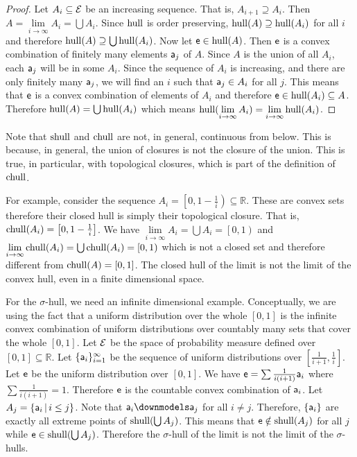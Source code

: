 \begin{mathSection}
\begin{proof}
	Let $A_i \subseteq \Ens$ be an increasing sequence. That is, $A_{i+1} \supseteq A_i$. Then $A = \lim\limits_{i \to \infty} A_i = \bigcup A_i$. Since $\hull$ is order preserving, $\hull(A) \supseteq \hull(A_i)$ for all $i$ and therefore $\hull(A) \supseteq \bigcup \hull(A_i)$. Now let $\ens \in \hull(A)$. Then $\ens$ is a convex combination of finitely many elements $\ens[a]_j$ of $A$. Since $A$ is the union of all $A_i$, each $\ens[a]_j$ will be in some $A_i$. Since the sequence of $A_i$ is increasing, and there are only finitely many $\ens[a]_j$, we will find an $i$ such that $\ens[a]_j \in A_i$ for all $j$. This means that $\ens$ is a convex combination of elements of $A_i$ and therefore $\ens \in \hull(A_i) \subseteq A$. Therefore $\hull(A) = \bigcup \hull(A_i)$ which means $\hull(\lim\limits_{i \to \infty} A_i) = \lim\limits_{i \to \infty} \hull(A_i)$.
\end{proof}


\begin{remark}
	Note that $\shull$ and $\chull$ are not, in general, continuous from below. This is because, in general, the union of closures is not the closure of the union. This is true, in particular, with topological closures, which is part of the definition of $\chull$.
	
	For example, consider the sequence $A_i = \left[0, 1-\frac{1}{i}\right) \subseteq \mathbb{R}$. These are convex sets therefore their closed hull is simply their topological closure. That is, $\chull(A_i) = \left[0, 1-\frac{1}{i}\right]$. We have $\lim\limits_{i \to \infty} A_i = \bigcup A_i = \left[0, 1\right)$ and $\lim\limits_{i \to \infty} \chull(A_i) = \bigcup \chull(A_i) = \left[0, 1\right)$ which is not a closed set and therefore different from $\chull(A) = [0,1]$. The closed hull of the limit is not the limit of the convex hull, even in a finite dimensional space.
	
	For the $\sigma$-hull, we need an infinite dimensional example. Conceptually, we are using the fact that a uniform distribution over the whole $[0,1]$ is the infinite convex combination of uniform distributions over countably many sets that cover the whole $[0,1]$. Let $\Ens$ be the space of probability measure defined over $[0,1] \subseteq \mathbb{R}$. Let $\{\ens[a]_i\}_{i=1}^{\infty}$ be the sequence of uniform distributions over $\left[\frac{1}{i+1}, \frac{1}{i}\right]$. Let $\ens$ be the uniform distribution over $[0,1]$. We have $\ens = \sum \frac{1}{i(i+1)} \ens[a]_i$ where $\sum \frac{1}{i(i+1)} = 1$. Therefore $\ens$ is the countable convex combination of $\ens[a]_i$. Let $A_j = \{ \ens[a]_i \, | \, i \leq j\}$. Note that $\ens[a]_i \separate \ens[a]_j$ for all $i \neq j$. Therefore, $\{\ens[a]_i\}$ are exactly all extreme points of $\shull(\bigcup A_j)$. This means that $\ens \notin \shull(A_j)$ for all $j$ while $\ens \in \shull(\bigcup A_j)$. Therefore the $\sigma$-hull of the limit is not the limit of the $\sigma$-hulls.
\end{remark}



\end{mathSection}
